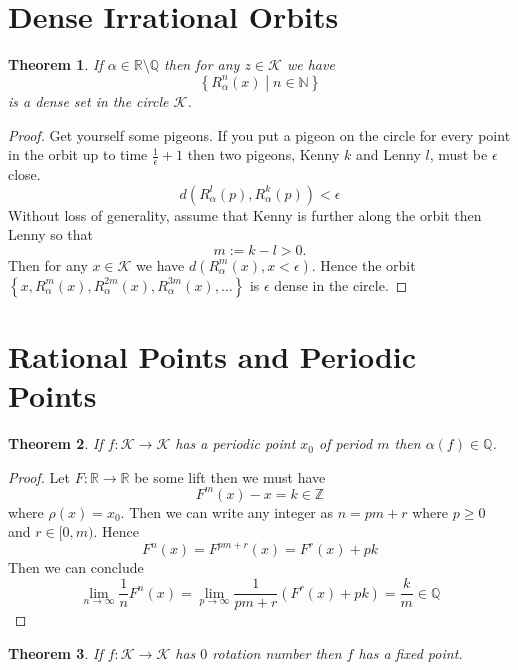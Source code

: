 \documentclass[11pt]{article}
\newcommand{\defeq}{:=}
\newcommand{\relmiddle}[1]{\mathrel{}\middle#1\mathrel{}}
\newcommand{\rmv}{\relmiddle|}
\newcommand{\R}{\mathbb{R}}
\newcommand{\Z}{\mathbb{Z}}
\newcommand{\N}{\mathbb{N}}
\newcommand{\Q}{\mathbb{Q}}
\newtheorem{theorem}{Theorem}[section]
\begin{document}
\section{Dense Irrational Orbits}
\begin{theorem}
If $\alpha\in\R\setminus\Q$ then for any $z\in\mathcal{K}$ we have
\[
	\left\{R_\alpha^n(x) \rmv n\in \N\right\}
\]
is a dense set in the circle $\mathcal{K}$.
\end{theorem}

\begin{proof}
Get yourself some pigeons.
If you put a pigeon on the circle for every point in the orbit up to time $\frac{1}{\epsilon}+1$ then two pigeons, Kenny $k$ and Lenny $l$, must be $\epsilon$ close.
\[
	d(R_\alpha^l(p), R_\alpha^k(p)) < \epsilon
\]
Without loss of generality, assume that Kenny is further along the orbit then Lenny so that 
\[m\defeq k-l > 0.\]
Then for any $x\in\mathcal{K}$ we have $d(R_\alpha^m(x), x < \epsilon)$.
Hence the orbit $\left\{x, R_\alpha^m(x), R_\alpha^{2m}(x), R_\alpha^{3m}(x) , \dots\right\}$ is $\epsilon$ dense in the circle.
\end{proof}

\section{Rational Points and Periodic Points}
\begin{theorem}
If $f:\mathcal{K}\to\mathcal{K}$ has a periodic point $x_0$ of period $m$ then $\alpha(f)\in\Q$.
\end{theorem}
\begin{proof}
Let $F:\R\to\R$ be some lift then we must have
\[
	F^m(x)-x = k\in \Z
\]
where $\rho(x)=x_0$.
Then we can write any integer as $n=pm+r$ where $p\geq 0$ and $r\in[0, m)$.
Hence
\[
	F^n(x)=F^{pm+r}(x)=F^r(x)+pk
\]
Then we can conclude
\[
	\lim_{n\to\infty}\frac{1}{n}F^n(x)=\lim_{p\to\infty}\frac{1}{pm+r}\left(F^r(x)+pk\right)=\frac{k}{m}\in\Q
\]
\end{proof}

\begin{theorem}
If $f:\mathcal{K}\to\mathcal{K}$ has $0$ rotation number then $f$ has a fixed point.
\end{theorem}
\end{document}
